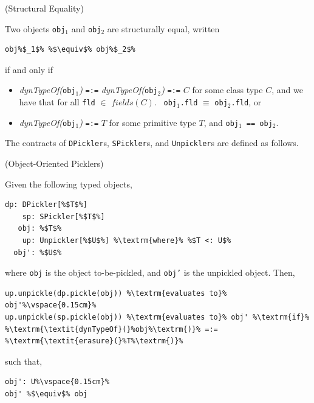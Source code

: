 \documentclass[preprint,10pt]{sigplanconf}
\theoremstyle{definition}
\theoremstyle{definition}
\newcommand{\term}[1]{\mbox{\texttt{#1}}}
\newcommand{\itl}[1]{\mbox{\textit{#1}}}
\begin{document}
\begin{defn}(Structural Equality)

\noindent Two objects \term{obj}$_1$ and \term{obj}$_2$ are structurally equal, written

\begin{lstlisting}[escapechar=\%]
obj%$_1$% %$\equiv$% obj%$_2$%
\end{lstlisting}

\noindent if and only if

\begin{itemize}
\item \itl{dynTypeOf(}\term{obj$_1$}\itl{)} \term{=:=} \itl{dynTypeOf(}\term{obj$_2$}\itl{)} \term{=:=} $C$
      for some class type $C$, and we have that for all \term{fld} $\in$ $\textit{fields}(C)$.
      ~\term{obj$_1$.fld} $\equiv$ \term{obj$_2$.fld}, or
\item \itl{dynTypeOf(}\term{obj$_1$}\itl{)} \term{=:=} $T$ for some primitive type $T$, and \term{obj$_1$ == obj$_2$}.
\end{itemize}
\end{defn}

The contracts of \term{DPickler}s, \term{SPickler}s, and \term{Unpickler}s are
defined as follows.

\begin{defn}(Object-Oriented Picklers)

\noindent Given the following typed objects,

\begin{lstlisting}[escapechar=\%]
    dp: DPickler[%$T$%]
    sp: SPickler[%$T$%]
   obj: %$T$%
    up: Unpickler[%$U$%] %\textrm{where}% %$T <: U$%
  obj': %$U$%
\end{lstlisting}

\noindent where \term{obj} is the object to-be-pickled, and \term{obj'} is the unpickled
object. Then,

\begin{lstlisting}[escapechar=\%]
up.unpickle(dp.pickle(obj)) %\textrm{evaluates to}% obj'%\vspace{0.15cm}%
up.unpickle(sp.pickle(obj)) %\textrm{evaluates to}% obj' %\textrm{if}% %\textrm{\textit{dynTypeOf}(}%obj%\textrm{)}% =:= %\textrm{\textit{erasure}(}%T%\textrm{)}%
\end{lstlisting}

\noindent such that,

\begin{lstlisting}[escapechar=\%]
obj': U%\vspace{0.15cm}%
obj' %$\equiv$% obj
\end{lstlisting}
\end{defn}
\end{document}
